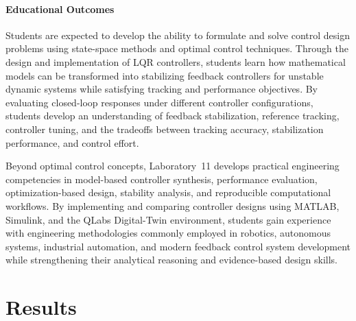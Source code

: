 \documentclass[journal]{IEEEtran}
\begin{document}
\paragraph{Educational Outcomes}
Students are expected to develop the ability to formulate and solve control design problems using state-space methods and optimal control techniques. Through the design and implementation of LQR controllers, students learn how mathematical models can be transformed into stabilizing feedback controllers for unstable dynamic systems while satisfying tracking and performance objectives. By evaluating closed-loop responses under different controller configurations, students develop an understanding of feedback stabilization, reference tracking, controller tuning, and the tradeoffs between tracking accuracy, stabilization performance, and control effort.

Beyond optimal control concepts, Laboratory~11 develops practical engineering competencies in model-based controller synthesis, performance evaluation, optimization-based design, stability analysis, and reproducible computational workflows. By implementing and comparing controller designs using MATLAB, Simulink, and the QLabs Digital-Twin environment, students gain experience with engineering methodologies commonly employed in robotics, autonomous systems, industrial automation, and modern feedback control system development while strengthening their analytical reasoning and evidence-based design skills.


\section{Results}
\label{sec:Results}
\end{document}
